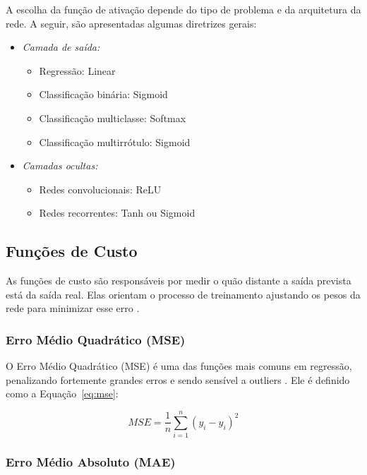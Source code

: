 A escolha da função de ativação depende do tipo de problema e da arquitetura da rede. A seguir, são apresentadas algumas diretrizes gerais:

\begin{itemize}
    \item \textit{Camada de saída:}
    \begin{itemize}
        \item Regressão: Linear
        \item Classificação binária: Sigmoid
        \item Classificação multiclasse: Softmax
        \item Classificação multirrótulo: Sigmoid
    \end{itemize}
    \item \textit{Camadas ocultas:}
    \begin{itemize}
        \item Redes convolucionais: ReLU
        \item Redes recorrentes: Tanh ou Sigmoid
    \end{itemize}
\end{itemize}

\subsection{Funções de Custo}

As funções de custo são responsáveis por medir o quão distante a saída prevista está da saída real. Elas orientam o processo de treinamento ajustando os pesos da rede para minimizar esse erro \cite{rashid2020survey}.

\subsubsection{Erro Médio Quadrático (MSE)}

O Erro Médio Quadrático (MSE) é uma das funções mais comuns em regressão, penalizando fortemente grandes erros e sendo sensível a outliers \cite{chicco2021advantages}. Ele é definido como a Equação~\ref{eq:mse}:

\begin{equation}
    MSE = \frac{1}{n} \sum_{i=1}^{n} (y_i - \hat{y}_i)^2
    \label{eq:mse}
\end{equation}

\subsubsection{Erro Médio Absoluto (MAE)}


